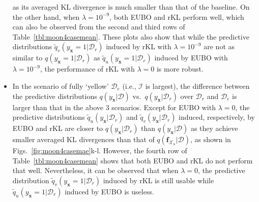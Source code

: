 \documentclass{article}
\theoremstyle{definition}
\newcommand{\mbf}[1]{\mathbf{#1}}
\newcommand{\mcl}[1]{\mathcal{#1}}
\newcommand{\da}{\mcl{D}}
\newcommand{\dc}{\mcl{D}_r}
\newcommand{\dr}{\mcl{D}_e}
\newcommand{\eubo}{\tilde{q}_u}
\newcommand{\elbo}{\tilde{q}_v}
\begin{document}
\begin{itemize}
    as its averaged KL divergence is much smaller than that of the baseline. 
    On the other hand, when $\lambda = 10^{-9}$, both EUBO and rKL perform well,
    which can also be observed from the second and third rows of Table~\ref{tbl:moon4casemean}.
    These plots also show that while the predictive distributions $\elbo(y_{\mbf{x}}=1|\dc)$ induced by rKL with $\lambda=10^{-9}$ are not as similar to $q(y_{\mbf{x}}=1|\dc)$ as $\eubo(y_{\mbf{x}}=1|\dc)$ induced by EUBO with $\lambda=10^{-9}$, the  performance of rKL with $\lambda = 0$ is more robust.
    \item In the scenario of fully `yellow' $\dr$ (i.e., $\mcl{I}$ is largest), the difference between the predictive distributions $q(y_{\mbf{x}}|\da)$ vs.~$q(y_{\mbf{x}}|\dc)$ over $\dc$ and $\dr$ is larger than that in the above $3$ scenarios. 
    Except for EUBO with $\lambda=0$, 
    the predictive distributions $\eubo(y_{\mbf{x}}|\dc)$ and $\elbo(y_{\mbf{x}}|\dc)$ induced, respectively, by EUBO and rKL are closer to $q(y_{\mbf{x}}|\dc)$ than $q(y_{\mbf{x}}|\da)$
    as they achieve smaller averaged KL divergences than that of $q(\mbf{f}_{\mcl{X}_u}|\da)$, as shown in Figs.~\ref{fig:moon4casemae}k-l. However, the fourth row of Table~\ref{tbl:moon4casemean} shows that both EUBO and rKL do not perform that well. Nevertheless, it can be observed that when $\lambda = 0$, the predictive distribution $\elbo(y_{\mbf{x}}=1|\dc)$ induced by rKL  is still usable while $\eubo(y_{\mbf{x}}=1|\dc)$ induced by EUBO is useless.
%    
\end{itemize}
%
\end{document}
